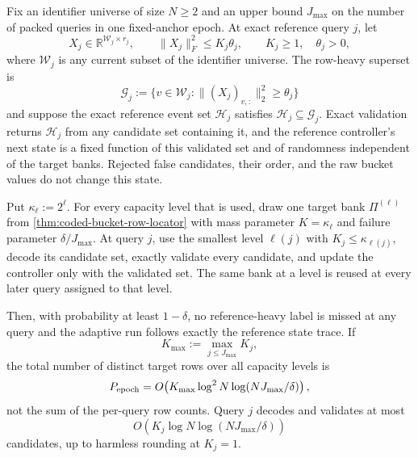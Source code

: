 \begin{theorem}
\label{thm:certified-adaptive-coded-bank-reuse}
Fix an identifier universe of size $N\geq2$ and an upper bound $J_{\max}$ on
the number of packed queries in one fixed-anchor epoch.  At exact reference
query $j$, let
\begin{equation*}
 X_j\in\mathbb R^{\mathcal W_j\times r_j},
 \qquad
 \|X_j\|_F^2\leq K_j\theta_j,
 \qquad
 K_j\geq1,\quad \theta_j>0,
\end{equation*}
where $\mathcal W_j$ is any current subset of the identifier universe.  The
row-heavy superset is
\begin{equation}
 \mathcal G_j
 :=\{v\in\mathcal W_j:\|(X_j)_{v,:}\|_2^2\geq\theta_j\}
 \label{eq:certified-reference-row-heavy-set}
\end{equation}
and suppose the exact reference event set $\mathcal H_j$ satisfies
$\mathcal H_j\subseteq\mathcal G_j$.  Exact validation returns
$\mathcal H_j$ from any candidate set containing it, and the reference
controller's next state is a fixed function of this validated set and of
randomness independent of the target banks.  Rejected false candidates,
their order, and the raw bucket values do not change this state.

Put $\kappa_\ell:=2^\ell$.  For every capacity level that is used, draw one
target bank $\Pi^{(\ell)}$ from
\cref{thm:coded-bucket-row-locator} with mass parameter
$K=\kappa_\ell$ and failure parameter $\delta/J_{\max}$.  At query $j$, use
the smallest level $\ell(j)$ with $K_j\leq\kappa_{\ell(j)}$, decode its
candidate set, exactly validate every candidate, and update the controller
only with the validated set.  The same bank at a level is reused at every
later query assigned to that level.

Then, with probability at least $1-\delta$, no reference-heavy label is
missed at any query and the adaptive run follows exactly the reference state
trace.  If
\begin{equation*}
 K_{\max}:=\max_{j\leq J_{\max}}K_j,
\end{equation*}
the total number of distinct target rows over all capacity levels is
\begin{equation}
 P_{\rm epoch}
 =O\!\left(
  K_{\max}\log^2N\log(NJ_{\max}/\delta)
 \right),
 \label{eq:certified-multiscale-bank-rows}
\end{equation}
not the sum of the per-query row counts.  Query $j$ decodes and validates at
most
\begin{equation}
 O\!\left(
  K_j\log N\log(NJ_{\max}/\delta)
 \right)
 \label{eq:certified-multiscale-query-candidates}
\end{equation}
candidates, up to harmless rounding at $K_j=1$.


\end{theorem}
